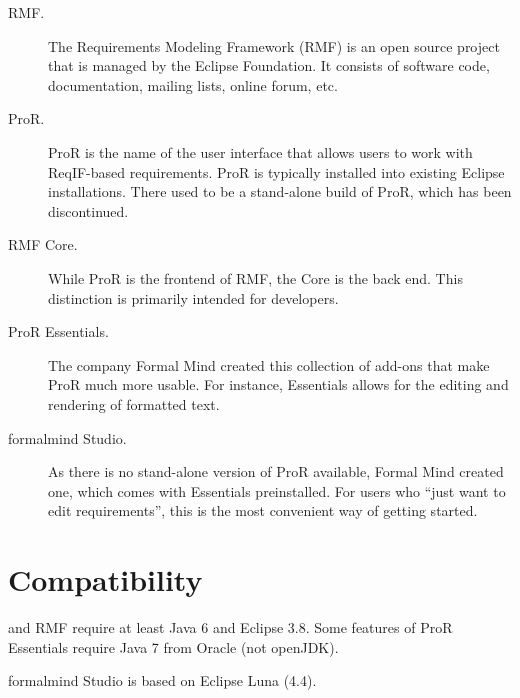 \begin{description}
\item[RMF.] The Requirements Modeling Framework (RMF) is an open source project that is managed by the Eclipse Foundation.  It consists of software code, documentation, mailing lists, online forum, etc.
\item[ProR.] ProR is the name of the user interface that allows users to work with ReqIF-based requirements.  ProR is typically installed into existing Eclipse installations.  There used to be a stand-alone build of ProR, which has been discontinued.
\item[RMF Core.] While ProR is the frontend of RMF, the Core is the back end.  This distinction is primarily intended for developers.
\item[ProR Essentials.] The company Formal Mind created this collection of add-ons that make ProR much more usable.  For instance, Essentials allows for the editing and rendering of formatted text.
\item[formalmind Studio.] As there is no stand-alone version of ProR available, Formal Mind created one, which comes with Essentials preinstalled.  For users who ``just want to edit requirements'', this is the most convenient way of getting started.
\end{description}

\section{Compatibility}

\pror{} and RMF require at least Java 6 and Eclipse 3.8.  Some features of ProR Essentials require Java 7 from Oracle (not openJDK).

formalmind Studio is based on Eclipse Luna (4.4).



